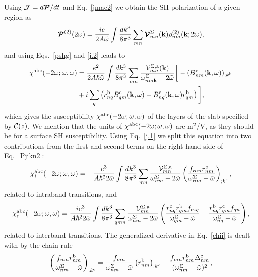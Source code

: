 \documentclass[floatfix,prb,aps,superscriptaddress,11pt,preprint,letterpaper]{revtex4}
\begin{document}
Using
$\boldsymbol{\mathcal{\cal J}}=d\boldsymbol{\mathcal{\cal P}}/dt$ 
and Eq.~\eqref{jmac2} 
we obtain the SH polarization of a given region as
\begin{equation}\label{Pjikn}
\boldsymbol{\mathcal{\cal P}}^{(2)}(2\omega)
=\frac{ie}{2A\tilde\omega}
\int \frac{dk^3}{8\pi^3}
\sum_{mn}
\boldsymbol{\mathcal{\cal V}}^{\Sigma}_{mn}(\mathbf{k})
\rho^{(2)}_{nm}(\mathbf{k};2\omega)
,
\end{equation}
and using Eqs.~\eqref{pshg} and \eqref{j.2} 
leads to
\begin{align}\label{Pjikn2}
\chi^{\mathrm{a}\mathrm{b}\mathrm{c}}(-2\omega;\omega,\omega) 
&=
\frac{e^2}{2A\hbar\tilde\omega}
\int \frac{dk^3}{8\pi^3}
\sum_{mn}
\frac{{\mathbf{\cal V}}^{\Sigma,\mathrm{a}}_{mn}(\mathbf{k})}
{\omega^\Sigma_{nm\mathbf{k}}-2\tilde\omega}
\bigg[
-(B_{nm}^{\mathrm{c}}(\mathbf{k},\omega))_{;k^{\mathrm{b}}}
\nonumber \\
&
+i\sum_q\left(r_{nq}^{\mathrm{b}}B_{qm}^{\mathrm{c}}(\mathbf{k},\omega) -
  B_{nq}^{\mathrm{c}}(\mathbf{k},\omega) 
  r_{qm}^{\mathrm{b}}\right)
\bigg]
,
\end{align}
which gives the susceptibility 
$\chi^{\mathrm{a}\mathrm{b}\mathrm{c}}(-2\omega;\omega,\omega)$ 
of the layers of the slab specified by ${\mathbf{\cal C}}(z)$. 
We mention that the units of 
$\chi^{\mathrm{a}\mathrm{b}\mathrm{c}}(-2\omega;\omega,\omega)$
are m$^2$/V, as they should be for a surface SH susceptibility.
Using Eq.~\eqref{j.1} we
split this equation into
two contributions from the first and second terms on the right hand side
of Eq.~\eqref{Pjikn2}:
\begin{equation}\label{chii}
\chi^{\mathrm{a}\mathrm{b}\mathrm{c}}_i (-2\omega;\omega,\omega)
=-\frac{e^3}{A\hbar^22\tilde\omega}
\int \frac{dk^3}{8\pi^3}
\sum_{mn}
\frac{{\mathbf{\cal V}}_{mn}^{\Sigma,\mathrm{a}}}{\omega^\Sigma_{nm}-2\tilde\omega}
\left(\frac{f_{mn}r_{nm}^{\mathrm{b}}}{\omega^\Sigma_{nm}-\tilde\omega}\right)_{;k^{\mathrm{c}}}
,
\end{equation} 
related to intraband transitions, and 
\begin{equation}\label{chie}
\chi^{\mathrm{a}\mathrm{b}\mathrm{c}}_e (-2\omega;\omega,\omega)
=\frac{ie^3}{A\hbar^22\tilde\omega}
\int \frac{dk^3}{8\pi^3}
\sum_{qmn}
\frac{{\mathbf{\cal V}}_{mn}^{\Sigma,\mathrm{a}}}{\omega^\Sigma_{nm}-2\tilde\omega}
\left(
\frac{r_{nq}^{\mathrm{c}} r_{qm}^{\mathrm{b}} 
f_{mq}}{\omega^\Sigma_{qm}-\tilde\omega}
-\frac{r_{nq}^{\mathrm{b}} r_{qm}^{\mathrm{c}} 
f_{qn}}{\omega^\Sigma_{nq}-\tilde\omega}
\right),
\end{equation} 
related to interband transitions.
The generalized derivative in Eq.~\eqref{chii} is dealt with by the chain rule 
\begin{equation}\label{gene2}
\left(\frac{f_{mn}r_{nm}^{\mathrm{b}}}{\omega^\Sigma_{nm}-\tilde\omega}\right)_{;k^{\mathrm{c}}}=
\frac{f_{mn}}{\omega^\Sigma_{nm}-\tilde\omega}\left(r_{nm}^{\mathrm{b}}\right)_{;k^{\mathrm{c}}}
-\frac{f_{mn}r_{nm}^{\mathrm{b}}\Delta_{nm}^{\mathrm{c}}}{(\omega^\Sigma_{nm}-\tilde\omega)^2}
,
\end{equation}
\end{document}
